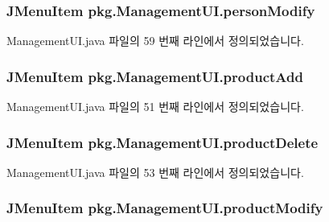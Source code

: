 \subsubsection[{\texorpdfstring{person\+Modify}{personModify}}]{\setlength{\rightskip}{0pt plus 5cm}J\+Menu\+Item pkg.\+Management\+U\+I.\+person\+Modify\hspace{0.3cm}{\ttfamily [private]}}\hypertarget{classpkg_1_1_management_u_i_aadf201377400033cf5739556137eca44}{}\label{classpkg_1_1_management_u_i_aadf201377400033cf5739556137eca44}


Management\+U\+I.\+java 파일의 59 번째 라인에서 정의되었습니다.

\subsubsection[{\texorpdfstring{product\+Add}{productAdd}}]{\setlength{\rightskip}{0pt plus 5cm}J\+Menu\+Item pkg.\+Management\+U\+I.\+product\+Add\hspace{0.3cm}{\ttfamily [private]}}\hypertarget{classpkg_1_1_management_u_i_afafd026c860294aea147d42bad8ac11f}{}\label{classpkg_1_1_management_u_i_afafd026c860294aea147d42bad8ac11f}


Management\+U\+I.\+java 파일의 51 번째 라인에서 정의되었습니다.

\subsubsection[{\texorpdfstring{product\+Delete}{productDelete}}]{\setlength{\rightskip}{0pt plus 5cm}J\+Menu\+Item pkg.\+Management\+U\+I.\+product\+Delete\hspace{0.3cm}{\ttfamily [private]}}\hypertarget{classpkg_1_1_management_u_i_a035f7669304affd98f4304a8639ce4e8}{}\label{classpkg_1_1_management_u_i_a035f7669304affd98f4304a8639ce4e8}


Management\+U\+I.\+java 파일의 53 번째 라인에서 정의되었습니다.

\subsubsection[{\texorpdfstring{product\+Modify}{productModify}}]{\setlength{\rightskip}{0pt plus 5cm}J\+Menu\+Item pkg.\+Management\+U\+I.\+product\+Modify\hspace{0.3cm}{\ttfamily [private]}}\hypertarget{classpkg_1_1_management_u_i_a2384d030e607b71538e1f809991b95be}{}\label{classpkg_1_1_management_u_i_a2384d030e607b71538e1f809991b95be}


